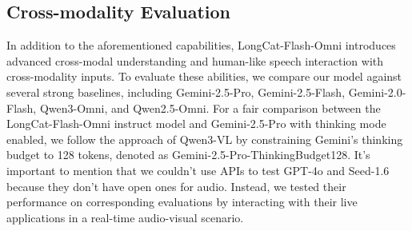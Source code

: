 \documentclass{article}
\begin{document}


\subsection{Cross-modality Evaluation}
In addition to the aforementioned capabilities, LongCat-Flash-Omni introduces advanced cross-modal understanding and human-like speech interaction with cross-modality inputs. To evaluate these abilities, we compare our model against several strong baselines, including Gemini-2.5-Pro, Gemini-2.5-Flash, Gemini-2.0-Flash, Qwen3-Omni, and Qwen2.5-Omni.
For a fair comparison between the LongCat-Flash-Omni instruct model and Gemini-2.5-Pro with thinking mode enabled, we follow the approach of Qwen3-VL by constraining Gemini’s thinking budget to 128 tokens, denoted as Gemini-2.5-Pro-ThinkingBudget128.
It's important to mention that we couldn't use APIs to test GPT-4o and Seed-1.6 because they don't have open ones for audio. Instead, we tested their performance on corresponding evaluations by interacting with their live applications in a real-time audio-visual scenario.
\end{document}
